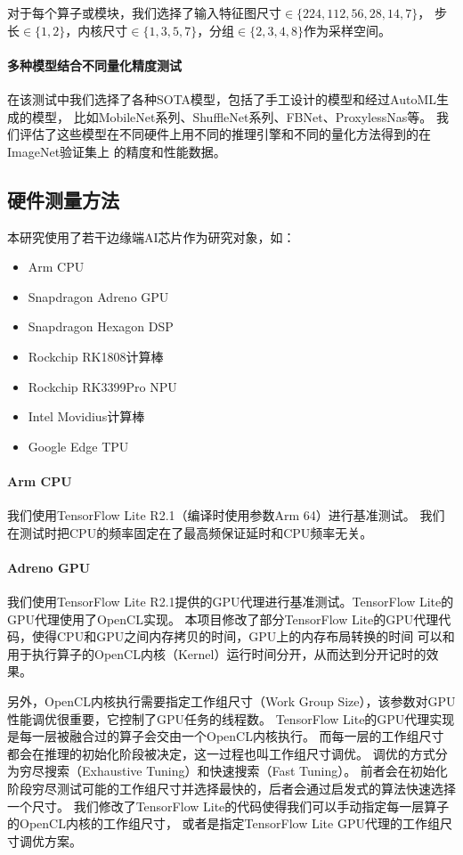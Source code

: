 对于每个算子或模块，我们选择了输入特征图尺寸$\in \{224,112,56,28,14,7\}$，
步长$\in \{1,2\}$，内核尺寸$\in \{1,3,5,7\}$，分组$\in \{2,3,4,8\}$作为采样空间。

\paragraph{多种模型结合不同量化精度测试}
在该测试中我们选择了各种SOTA模型，包括了手工设计的模型和经过AutoML生成的模型，
比如MobileNet系列、ShuffleNet系列、FBNet\cite{wu2019fbnet}、ProxylessNas\cite{cai2018proxylessnas}等。
我们评估了这些模型在不同硬件上用不同的推理引擎和不同的量化方法得到的在ImageNet\cite{deng2009imagenet}验证集上
的精度和性能数据。

\subsection{硬件测量方法}
本研究使用了若干边缘端AI芯片作为研究对象，如：
\begin{itemize}
    \item Arm CPU
    \item Snapdragon Adreno GPU
    \item Snapdragon Hexagon DSP
    \item Rockchip RK1808计算棒
    \item Rockchip RK3399Pro NPU
    \item Intel Movidius计算棒
    \item Google Edge TPU
\end{itemize}

\paragraph{Arm CPU}
我们使用TensorFlow Lite R2.1（编译时使用参数Arm 64）进行基准测试。
我们在测试时把CPU的频率固定在了最高频保证延时和CPU频率无关。

\paragraph{Adreno GPU}
我们使用TensorFlow Lite R2.1提供的GPU代理进行基准测试。TensorFlow Lite的GPU代理使用了OpenCL实现。
本项目修改了部分TensorFlow Lite的GPU代理代码，使得CPU和GPU之间内存拷贝的时间，GPU上的内存布局转换的时间
可以和用于执行算子的OpenCL内核（Kernel）运行时间分开，从而达到分开记时的效果。

另外，OpenCL内核执行需要指定工作组尺寸（Work Group Size），该参数对GPU性能调优很重要，它控制了GPU任务的线程数。
TensorFlow Lite的GPU代理实现是每一层被融合过的算子会交由一个OpenCL内核执行。
而每一层的工作组尺寸都会在推理的初始化阶段被决定，这一过程也叫工作组尺寸调优。
调优的方式分为穷尽搜索（Exhaustive Tuning）和快速搜索（Fast Tuning）。
前者会在初始化阶段穷尽测试可能的工作组尺寸并选择最快的，后者会通过启发式的算法快速选择一个尺寸。
我们修改了TensorFlow Lite的代码使得我们可以手动指定每一层算子的OpenCL内核的工作组尺寸，
或者是指定TensorFlow Lite GPU代理的工作组尺寸调优方案。

